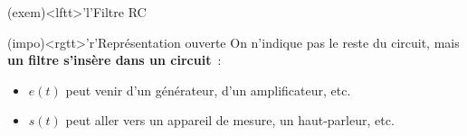\documentclass[../../main/main.tex]{subfiles}
\begin{document}
\begin{tcbraster}[raster columns=2, raster equal height=rows]
	\begin{tcb}(exem)<lftt>'l'{Filtre RC}
		\begin{minipage}{\linewidth}
			\vspace{-15pt}
		\end{minipage}
	\end{tcb}
	\begin{tcb}(impo)<rgtt>'r'{Représentation ouverte}
		On n'indique pas le reste du circuit, mais \textbf{un filtre s'insère
			dans un circuit}~:
		\begin{itemize}
			\item $e(t)$ peut venir d'un générateur, d'un amplificateur, etc.
			\item $s(t)$ peut aller vers un appareil de mesure, un haut-parleur,
			      etc.
		\end{itemize}
	\end{tcb}
\end{tcbraster}
\end{document}
